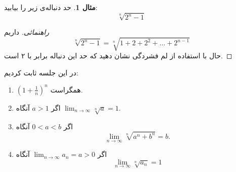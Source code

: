 \documentclass[12pt,a4paper]{article}
\theoremstyle{definition}
\newtheorem{mesal}[thm]{مثال}
\begin{document}
\begin{mesal}
حد دنباله‌ی زیر را بیابید:
\[
\sqrt[n]{2^n-1}
\]
\begin{proof}[راهنمائی]
داریم
\[
\sqrt[n]{2^n-1}=\sqrt[n]{1+2+2^2+\ldots+2^{n-1}}
\]
حال با استفاده از لم فشردگی نشان دهید که حد این دنباله برابر با ۲ است. 
\end{proof}
\end{mesal}
\begin{framed}
در این جلسه ثابت کردیم:
\begin{enumerate}
\item 
$(1+\frac{1}{n})^n$
همگراست.
\item 
اگر
$a>1$
آنگاه
$\lim_{n\to \infty} \sqrt[n]{a}=1$.
\item 
اگر 
$0<a<b$
آنگاه
\[
\lim_{n \to \infty}\sqrt[n]{a^n+b^n}=b.
\]
\item 
 اگر 
$\lim_{n \to \infty}a_n=a>0$
آنگاه 
\[
\lim_{n \to \infty}\sqrt[n]{a_n}=1
\]
\end{enumerate}

\end{framed}
\end{document}
